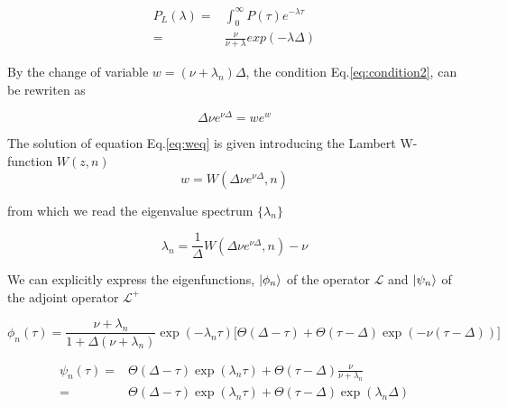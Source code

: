 \documentclass[12pt,twoside]{report}
\begin{document}
\begin{align}
P_L(\lambda)=&\int_0^\infty P(\tau)e^{-\lambda \tau}\nonumber\\
=&\frac{\nu}{\nu+\lambda}exp(-\lambda \Delta)
\end{align}


By the change of variable $w=(\nu+\lambda_n)\Delta$, the condition Eq.\eqref{eq:condition2}, can be rewriten as


\begin{equation}
\label{eq:weq}
\Delta \nu e^{\nu\Delta}=we^{w} 
\end{equation}

The solution of equation Eq.\eqref{eq:weq} is given introducing the Lambert W-function $W(z,n)$
\begin{equation}
w=W(\Delta \nu e^{\nu\Delta},n)
\end{equation}

from which we read the eigenvalue spectrum $\{\lambda_n\}$

\begin{equation}
\lambda_n=\frac{1}{\Delta}W(\Delta \nu e^{\nu\Delta},n) - \nu
\end{equation}


We can explicitly express the eigenfunctions, $\ket{\phi_n}$ of the operator $\mathcal{L}$ and $\ket{\psi_n}$ of  the adjoint operator $\mathcal{L}^+$


\begin{equation}
\phi_n(\tau)= \frac{\nu+\lambda_n}{1+\Delta(\nu+\lambda_n)}\exp(-\lambda_n\tau)\big[\Theta(\Delta-\tau) +  \Theta(\tau-\Delta) \exp(-\nu(\tau-\Delta))\big]
\end{equation}


\begin{align}
\psi_n(\tau)=&\Theta(\Delta-\tau)\exp(\lambda_n\tau) +  \Theta(\tau-\Delta) \frac{\nu}{\nu+\lambda_n}\\
=&\Theta(\Delta-\tau)\exp(\lambda_n\tau) +  \Theta(\tau-\Delta) \exp(\lambda_n\Delta)\\
\end{align}
\end{document}

